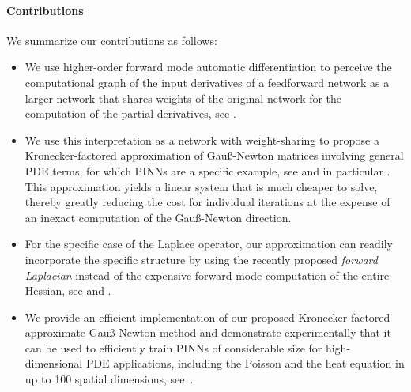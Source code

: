 \paragraph{Contributions} %
We summarize our contributions as follows: 
\begin{itemize}
    \item We use higher-order forward mode automatic differentiation to perceive the computational graph of the input derivatives of a feedforward network as a larger network that shares weights of the original network for the computation of the partial derivatives, see . 
    
    \item We use this interpretation as a network with weight-sharing 
    to propose a Kronecker-factored approximation of Gauß-Newton matrices involving general PDE terms, for which PINNs are a specific example, 
    see  and in particular . 
    This approximation yields a linear system that is much cheaper to solve, thereby greatly reducing the cost for individual iterations at the expense of an inexact computation of the Gauß-Newton direction. 
    
    \item For the specific case of the Laplace operator, our approximation can readily incorporate the specific structure by using the recently proposed \emph{forward Laplacian} instead of the expensive forward mode computation of the entire Hessian, see  and . 
    
    \item We provide an efficient implementation of our proposed Kronecker-factored approximate Gauß-Newton method and demonstrate experimentally that it can be used to efficiently train PINNs of considerable size for high-dimensional PDE applications, including the Poisson and the heat equation in up to 100 spatial dimensions, see~.  
\end{itemize}

